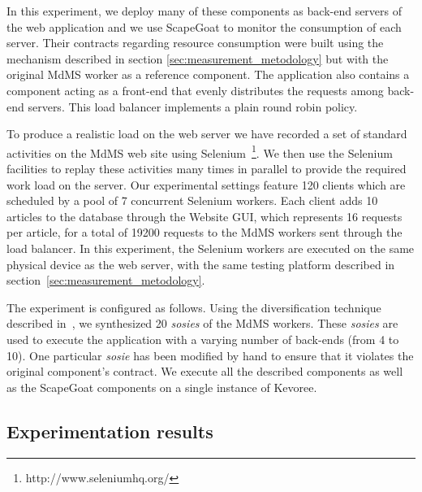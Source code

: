In this experiment, we deploy many of these components as back-end servers of the web application and we use ScapeGoat to monitor the consumption of each server.
Their contracts regarding resource consumption were built using the mechanism described in section \ref{sec:measurement_metodology} but with the original MdMS worker as a reference component.
The application also contains a component acting as a front-end that evenly distributes the requests among back-end servers.
This load balancer implements a plain round robin policy.

To produce a realistic load on the web server we have recorded a set of standard activities on the MdMS web site using Selenium~\footnote{http://www.seleniumhq.org/}.
We then use the Selenium facilities to replay these activities many times in parallel to provide the required work load on the server.
Our experimental settings feature 120 clients which are scheduled by a pool of 7 concurrent Selenium workers.
Each client adds 10 articles to the database through the Website GUI, which represents 16 requests per article, for a total of 19200 requests to the MdMS workers sent through the load balancer.
In this experiment, the Selenium workers are executed on the same physical device as the web server, with the same testing platform described in section~\ref{sec:measurement_metodology}.

The experiment is configured as follows.
Using the diversification technique described in~\cite{baudry2014tailored}, we synthesized 20 \textit{sosies} of the MdMS workers.
These \textit{sosies} are used to execute the application with a varying number of back-ends (from 4 to 10).
One particular \textit{sosie} has been modified by hand to ensure that it violates the original component's contract.
We execute all the described components as well as the ScapeGoat components on a single instance of Kevoree.

\subsection{Experimentation results}

